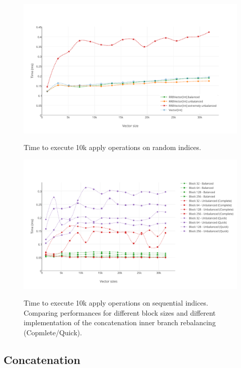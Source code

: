\begin{figure}[h!]
  \centering
  \includegraphics[width=\textwidth]{Benchmarks/Apply_random_3.pdf}
  \label{ApplyRandomBenchmarks}
  \caption{Time to execute 10k apply operations on random indices.}
\end{figure}

\begin{figure}[h!]
  \centering
  \includegraphics[width=\textwidth]{Benchmarks/apply_blocks.pdf}
  \label{ApplyBlocksBenchmarks}
  \caption{Time to execute 10k apply operations on sequential indices. Comparing performances for different block sizes and different implementation of the concatenation inner branch rebalancing (Copmlete/Quick).}
\end{figure}

\subsection{Concatenation}



